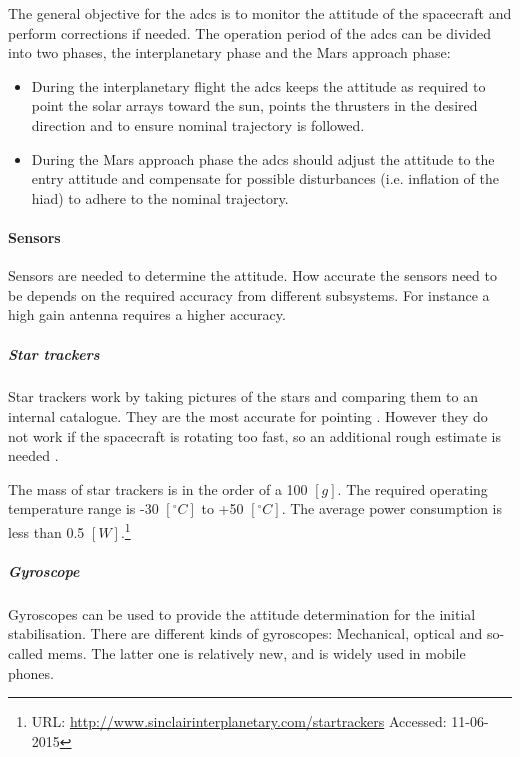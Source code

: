 The general objective for the \gls{adcs} is to monitor the attitude of the spacecraft and perform corrections if needed. The operation period of the \gls{adcs} can be divided into two phases, the interplanetary phase and the Mars approach phase:
\begin{itemize}
\item During the interplanetary flight the \gls{adcs} keeps the attitude as required to point the solar arrays toward the sun, points the thrusters in the desired direction and to ensure nominal trajectory is followed.

\item During the Mars approach phase the \gls{adcs} should adjust the attitude to the entry attitude and compensate for possible disturbances (i.e. inflation of the \gls{hiad}) to adhere to the nominal trajectory.
\end{itemize}
\paragraph{Sensors} Sensors are needed to determine the attitude. How accurate the sensors need to be depends on the required accuracy from different subsystems. For instance a high gain antenna requires a higher accuracy. 

\subparagraph{Star trackers}
Star trackers work by taking pictures of the stars and comparing them to an internal catalogue. They are the most accurate for pointing \cite{CarlChristianLiebe1995}. However they do not work if the spacecraft is rotating too fast, so an additional rough estimate is needed \cite[p. 584]{Wertz2011}. 

The mass of star trackers is in the order of a 100 $\left[g\right]$. The required operating temperature range is -30 $\left[^\circ C\right]$ to +50 $\left[^\circ C\right]$. The average power consumption is less than 0.5 $\left[W\right]$.\footnote{URL: \url{http://www.sinclairinterplanetary.com/startrackers} Accessed: 11-06-2015}

\subparagraph{Gyroscope}                        
Gyroscopes can be used to provide the attitude determination for the initial stabilisation. There are different kinds of gyroscopes: Mechanical, optical and so-called \gls{mems}. The latter one is relatively new, and is widely used in mobile phones. 


